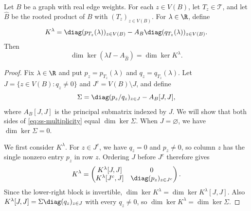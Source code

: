 \begin{lemma}\label{lem:ss-rooted-multiplicity}
Let $B$ be a graph with real edge weights.
For each $z\in V(B)$, let $T_z\in\mathcal T$, and let $\widehat B$ be the
rooted product of $B$ with $(T_z)_{z\in V(B)}$.
For $\lambda\in\R$, define
\begin{equation}\label{eq:ss-rooted-core}
 K^\lambda=\diag(p_{T_z}(\lambda))_{z\in V(B)}
       -A_B\diag(q_{T_z}(\lambda))_{z\in V(B)}.
\end{equation}
Then
\begin{equation}\label{eq:ss-multiplicity}
 \dim\ker(\lambda I-A_{\widehat B})=\dim\ker K^\lambda.
\end{equation}
\end{lemma}
\begin{proof}
Fix $\lambda\in\R$ and put
$p_z=p_{T_z}(\lambda)$ and $q_z=q_{T_z}(\lambda)$.
Let $J=\{z\in V(B):q_z\ne0\}$ and $J^c=V(B)\setminus J$, and define
\begin{equation}\label{eq:ss-schur-core}
 \Sigma=\diag(p_z/q_z)_{z\in J}-A_{B}[J,J],
\end{equation}
where $A_{B}[J,J]$ is the principal submatrix indexed by $J$.
We will show that both sides of \cref{eq:ss-multiplicity} equal
$\dim\ker \Sigma$.
When $J=\varnothing$, we have $\dim\ker \Sigma=0$.

We first consider $K^\lambda$.
For $z\in J^c$, we have $q_z=0$ and $p_z\ne0$, so column $z$
has the single nonzero entry $p_z$ in row $z$.
Ordering $J$ before $J^c$ therefore gives
\begin{equation}\label{eq:ss-core-partition}
 K^\lambda=
 \begin{pmatrix}
 K^\lambda[J,J]&0\\
 K^\lambda[J^c,J]&\diag(p_z)_{z\in J^c}
 \end{pmatrix}.
\end{equation}
Since the lower-right block is invertible,
$\dim\ker K^\lambda=\dim\ker K^\lambda[J,J]$.
Also $K^\lambda[J,J]=\Sigma\diag(q_z)_{z\in J}$ with every $q_z\ne0$,
so $\dim\ker K^\lambda=\dim\ker \Sigma$.


\end{proof}
